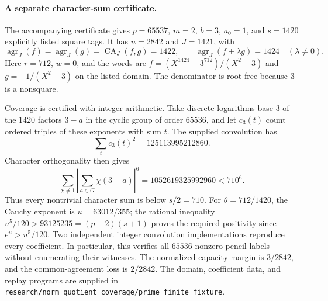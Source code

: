 \paragraph{A separate character-sum certificate.}
The accompanying certificate gives $p=65537$, $m=2$, $b=3$,
$a_0=1$, and $s=1420$ explicitly listed square tags.
It has $n=2842$ and $J=1421$, with
\[
 \operatorname{agr}_J(f)=\operatorname{agr}_J(g)
 =\operatorname{CA}_J(f,g)=1422,
 \qquad
 \operatorname{agr}_J(f+\lambda g)=1424\quad(\lambda\ne0).
\]
Here $r=712$, $w=0$, and the words are
$f=(X^{1424}-3^{712})/(X^2-3)$ and $g=-1/(X^2-3)$ on the
listed domain.  The denominator is root-free because $3$ is a nonsquare.

Coverage is certified with integer arithmetic.  Take discrete logarithms
base $3$ of the $1420$ factors $3-a$ in the cyclic group of order $65536$,
and let $c_3(t)$ count ordered triples of these exponents with sum $t$.
The supplied convolution has
\[
 \sum_t c_3(t)^2=125113995212860.
\]
Character orthogonality then gives
\[
 \sum_{\chi\ne1}\left|\sum_{a\in G}\chi(3-a)\right|^6
 =1052619325992960<710^6.
\]
Thus every nontrivial character sum is below $s/2=710$.
For $\theta=712/1420$, the Cauchy exponent is $u=63012/355$;
the rational inequality $u^5/120>93125235=(p-2)(s+1)$ proves
the required positivity since $e^u>u^5/120$.
Two independent integer convolution implementations reproduce every
coefficient.  In particular, this verifies all $65536$ nonzero pencil
labels without enumerating their witnesses.  The normalized capacity
margin is $3/2842$, and the common-agreement loss is $2/2842$.
The domain, coefficient data, and replay programs are supplied in
\texttt{research/norm\_quotient\_coverage/prime\_finite\_fixture}.
